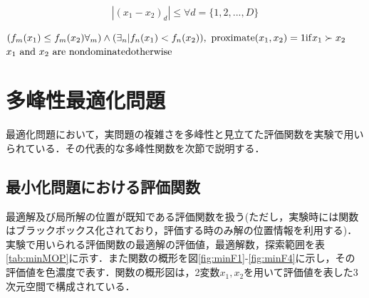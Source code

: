 \documentclass[a4j,11pt]{jarticle}
\begin{document}
\begin{equation}
|(x_1-x_2)_d| \leq \forall d = \{1,2,...,D\}
\end{equation}


$(f_m(x_1) \leq f_m(x_2) \forall_m) \wedge (\exists_n | f_n(x_1) < f_n(x_2)), \ {\rm proximate}(x_1, x_2) = 1   {\rm if }  x_1 \succ x_2 $ \\
$x_1 \ {\rm and} \ x_2 \ {\rm are \ non dominated}  {\rm otherwise}$



\newpage
\section{多峰性最適化問題}
\label{sec:MOP}
最適化問題において，実問題の複雑さを多峰性と見立てた評価関数を実験で用いられている．その代表的な多峰性関数を次節で説明する．


\subsection{最小化問題における評価関数}
\label{ss:MinFunc}
最適解及び局所解の位置が既知である評価関数を扱う(ただし，実験時には関数はブラックボックス化されており，評価する時のみ解の位置情報を利用する)．
実験で用いられる評価関数の最適解の評価値，最適解数，探索範囲を表\ref{tab:minMOP}に示す．また関数の概形を図\ref{fig:minF1}-\ref{fig:minF4}に示し，その評価値を色濃度で表す．関数の概形図は，2変数$x_1, x_2$を用いて評価値を表した3次元空間で構成されている．
\end{document}
